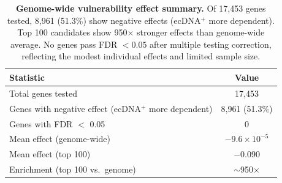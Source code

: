\documentclass{article}
\begin{document}
\begin{table}[ht]
\caption{\textbf{Genome-wide vulnerability effect summary.} Of 17,453 genes tested, 8,961 (51.3\%) show negative effects (ecDNA$^+$ more dependent). Top 100 candidates show 950$\times$ stronger effects than genome-wide average. No genes pass FDR $<0.05$ after multiple testing correction, reflecting the modest individual effects and limited sample size.}
\label{tab:genomewide}
\centering
\small
\begin{tabular}{@{}lc@{}}
\toprule
Statistic & Value \\
\midrule
Total genes tested & 17,453 \\
Genes with negative effect (ecDNA$^+$ more dependent) & 8,961 (51.3\%) \\
Genes with FDR $<$ 0.05 & 0 \\
Mean effect (genome-wide) & $-9.6 \times 10^{-5}$ \\
Mean effect (top 100) & $-0.090$ \\
Enrichment (top 100 vs.\ genome) & $\sim$950$\times$ \\
\bottomrule
\end{tabular}
\end{table}
\end{document}
